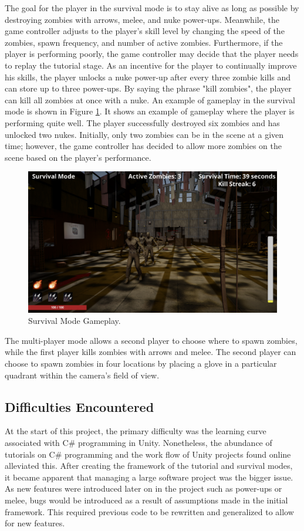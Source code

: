 \documentclass[titlepage, 12pt]{scrartcl}
\begin{document}
    The goal for the player in the survival mode is to stay alive as long as possible by destroying zombies with arrows, melee, and nuke power-ups. Meanwhile, the game controller adjusts to the player's skill level by changing the speed of the zombies, spawn frequency, and number of active zombies. Furthermore, if the player is performing poorly, the game controller may decide that the player needs to replay the tutorial stage. As an incentive for the player to continually improve his skills, the player unlocks a nuke power-up after every three zombie kills and can store up to three power-ups. By saying the phrase "kill zombies", the player can kill all zombies at once with a nuke. An example of gameplay in the survival mode is shown in Figure \ref{fig:survival}. It shows an example of gameplay where the player is performing quite well. The player successfully destroyed six zombies and has unlocked two nukes. Initially, only two zombies can be in the scene at a given time; however, the game controller has decided to allow more zombies on the scene based on the player's performance. 
            \begin{figure}
            \centering
            \includegraphics[scale=0.3]{figures/survival.png}
            \caption{Survival Mode Gameplay.}
            \label{fig:survival}
        \end{figure}
    \par
    The multi-player mode allows a second player to choose where to spawn zombies, while the first player kills zombies with arrows and melee. The second player can choose to spawn zombies in four locations by placing a glove in a particular quadrant within the camera's field of view. 

    \subsection{Difficulties Encountered}
    At the start of this project, the primary difficulty was the learning curve associated with C\# programming in Unity. Nonetheless, the abundance of tutorials on C\# programming and the work flow of Unity projects found online alleviated this. After creating the framework of the tutorial and survival modes, it became apparent that managing a large software project was the bigger issue. As new features were introduced later on in the project such as power-ups or melee, bugs would be introduced as a result of assumptions made in the initial framework. This required previous code to be rewritten and generalized to allow for new features. 
\end{document}
